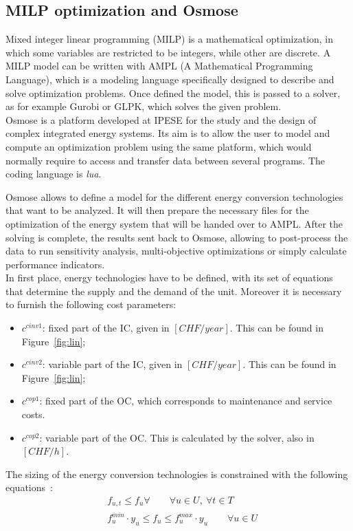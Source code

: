 \documentclass{article}
\begin{document}
\subsection{MILP optimization and Osmose}\label{ss:osmose}

Mixed integer linear programming (MILP) is a mathematical optimization, in which some variables are restricted to be integers, while other are discrete. A MILP model can be written with AMPL (A Mathematical Programming Language), which is a modeling language specifically designed to describe and solve optimization problems. Once defined the model, this is passed to a solver, as for example Gurobi or GLPK, which solves the given problem.\\

Osmose is a platform developed at IPESE for the study and the design of complex integrated energy systems. Its aim is to allow the user to model and compute an optimization problem using the same platform, which would normally require to access and transfer data between several programs. The coding language is \textit{lua}.

Osmose allows to define a model for the different energy conversion technologies that want to be analyzed. It will then prepare the necessary files for the optimization of the energy system that will be handed over to AMPL. After the solving is complete, the results sent back to Osmose, allowing to post-process the data to run sensitivity analysis, multi-objective optimizations or simply calculate performance indicators.\\

In first place, energy technologies have to be defined, with its set of equations that determine the supply and the demand of the unit. Moreover it is necessary to furnish the following cost parameters:
\begin{itemize}
	\item $c^{cinv1}$: fixed part of the IC, given in $[CHF/year]$. This can be found in Figure~\ref{fig:lin};
	\item $c^{cinv2}$: variable part of the IC, given in $[CHF/year]$. This can be found in Figure~\ref{fig:lin};
	\item $c^{cop1}$: fixed part of the OC, which corresponds to maintenance and service costs. 
	\item $c^{cop2}$: variable part of the OC. This is calculated by the solver, also in $[CHF/h]$.
\end{itemize}

The sizing of the energy conversion technologies is constrained with the following equations~\cite{suciuEnergyIntegrationCO22018}:
\begin{align}
& f_{u,t} \leq f_{u} \forall \qquad \forall u \in U, \ \forall t \in T  \\
& f_{u}^{min} \cdot y_{u} \leq f_{u} \leq f_{u}^{max} \cdot y_{u} \qquad \forall u \in U\\
\end{align}
\end{document}
